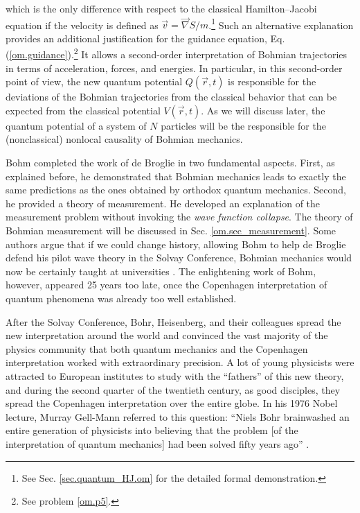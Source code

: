 \documentclass[onecolumn,nofootinbib, secnumarabic, amsmath, nobibnotes,11pt,aps,pra]{revtex4-1}
\newcommand{\sref}[1]{Sec. \ref{#1}}
\newcommand{\eref}[1]{Eq. (\ref{#1})}
\begin{document}
which is the only difference with respect to the classical
Hamilton--Jacobi equation if the velocity is defined as $\vec{v} =
\vec{\nabla}S / m$.\footnote{See \sref{sec.quantum_HJ.om} for the
detailed formal demonstration.} Such an alternative explanation
provides an additional justification for the guidance equation,
\eref{om.guidance}.\footnote{See problem \ref{om.p5}.} It allows a
second-order interpretation of Bohmian trajectories in terms of
acceleration, forces, and energies. In particular, in this
second-order point of view, the new quantum potential $Q(\vec{r},t)$
is responsible for the deviations of the Bohmian trajectories from
the classical behavior that can be expected from the classical
potential $V(\vec{r},t)$. As we will discuss later, the quantum
potential of a system of $N$ particles will be the responsible for
the (nonclassical) nonlocal causality of Bohmian mechanics.

Bohm completed the work of de Broglie in two fundamental aspects. First, as explained before, he demonstrated that Bohmian mechanics leads to exactly the same predictions as the ones obtained by orthodox quantum mechanics. Second, he provided a theory of measurement. He developed an explanation of the measurement problem without invoking the \textit{wave function collapse}. The theory of Bohmian measurement will be discussed in \sref{om.sec_measurement}. Some authors argue that if we could change history, allowing Bohm to help de Broglie defend his pilot wave theory in the Solvay Conference, Bohmian mechanics would now be certainly taught at universities \cite{om.nikolic2008a}. The enlightening work of Bohm, however, appeared 25 years too late, once the Copenhagen interpretation of quantum phenomena was already too well established.

After the Solvay Conference, Bohr, Heisenberg, and their colleagues
spread the new interpretation around the world and convinced the
vast majority of the physics community that both quantum mechanics
and the Copenhagen interpretation worked with extraordinary precision. A lot of
young physicists were attracted to European institutes to study with
the ``fathers'' of this new theory, and during the second quarter of
the twentieth century, as good disciples, they spread the Copenhagen
interpretation over the entire globe. In his 1976 Nobel lecture,
Murray Gell-Mann referred to this question: ``Niels Bohr brainwashed
an entire generation of physicists into believing that the problem
[of the interpretation of quantum mechanics] had been solved fifty
years ago'' \cite{om.hard}.
\end{document}
